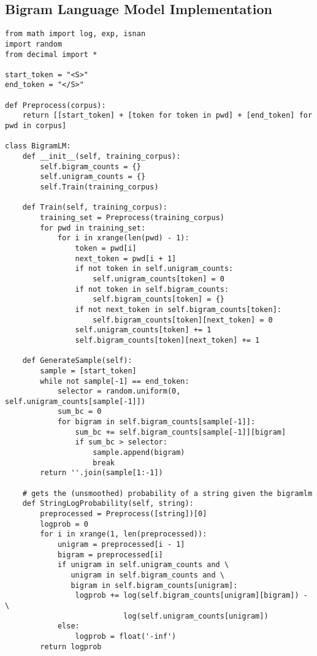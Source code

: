 \documentclass{amsart}
\theoremstyle{definition}
\theoremstyle{remark}
\numberwithin{equation}{section}
\begin{document}
\subsection{Bigram Language Model Implementation}
\begin{lstlisting}
from math import log, exp, isnan
import random
from decimal import *

start_token = "<S>"
end_token = "</S>"

def Preprocess(corpus):
    return [[start_token] + [token for token in pwd] + [end_token] for pwd in corpus]

class BigramLM:
    def __init__(self, training_corpus):
        self.bigram_counts = {}
        self.unigram_counts = {}
        self.Train(training_corpus)

    def Train(self, training_corpus):
        training_set = Preprocess(training_corpus)
        for pwd in training_set:
            for i in xrange(len(pwd) - 1):
                token = pwd[i]
                next_token = pwd[i + 1]
                if not token in self.unigram_counts:
                    self.unigram_counts[token] = 0
                if not token in self.bigram_counts:
                    self.bigram_counts[token] = {}
                if not next_token in self.bigram_counts[token]:
                    self.bigram_counts[token][next_token] = 0
                self.unigram_counts[token] += 1
                self.bigram_counts[token][next_token] += 1

    def GenerateSample(self):
        sample = [start_token]
        while not sample[-1] == end_token:
            selector = random.uniform(0, self.unigram_counts[sample[-1]])
            sum_bc = 0
            for bigram in self.bigram_counts[sample[-1]]:
                sum_bc += self.bigram_counts[sample[-1]][bigram]
                if sum_bc > selector:
                    sample.append(bigram)
                    break
        return ''.join(sample[1:-1])

    # gets the (unsmoothed) probability of a string given the bigramlm
    def StringLogProbability(self, string):
        preprocessed = Preprocess([string])[0]
        logprob = 0
        for i in xrange(1, len(preprocessed)):
            unigram = preprocessed[i - 1]
            bigram = preprocessed[i]
            if unigram in self.unigram_counts and \
               unigram in self.bigram_counts and \
               bigram in self.bigram_counts[unigram]:
                logprob += log(self.bigram_counts[unigram][bigram]) - \
                           log(self.unigram_counts[unigram])
            else:
                logprob = float('-inf')
        return logprob


\end{lstlisting}
\end{document}
